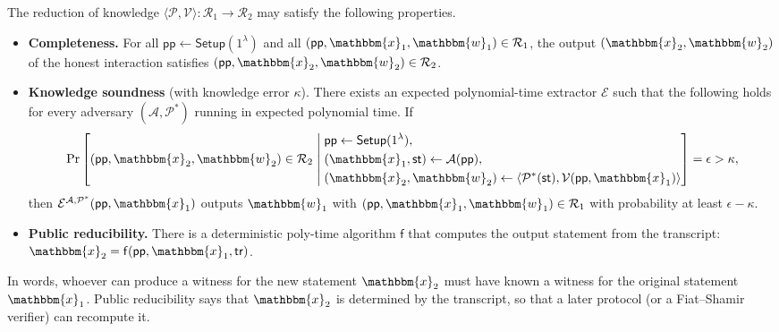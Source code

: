 \documentclass[../../book.tex]{subfiles}
\begin{document}
\begin{definition}
    The reduction of knowledge $\langle \mathcal{P}, \mathcal{V} \rangle: \mathcal{R}_1 \to \mathcal{R}_2$ may satisfy the following properties.
    \begin{itemize}
        \item \textbf{Completeness.} For all $\mathsf{pp} \gets \mathsf{Setup}(1^{\lambda})$ and all $(\mathsf{pp}, \mathbbm{x}_1, \mathbbm{w}_1) \in \mathcal{R}_1$, the output $(\mathbbm{x}_2, \mathbbm{w}_2)$ of the honest interaction satisfies $(\mathsf{pp}, \mathbbm{x}_2, \mathbbm{w}_2) \in \mathcal{R}_2$.
        \item \textbf{Knowledge soundness} (with knowledge error $\kappa$). There exists an expected polynomial-time extractor $\mathcal{E}$ such that the following holds for every adversary $(\mathcal{A}, \mathcal{P}^{\ast})$ running in expected polynomial time. If
        \begin{equation*}
            \Pr\left[(\mathsf{pp}, \mathbbm{x}_2, \mathbbm{w}_2) \in \mathcal{R}_2 \;\middle|\;
            \begin{aligned}
                & \mathsf{pp} \gets \mathsf{Setup}(1^{\lambda}), \\
                & (\mathbbm{x}_1, \mathsf{st}) \gets \mathcal{A}(\mathsf{pp}), \\
                & (\mathbbm{x}_2, \mathbbm{w}_2) \gets \langle \mathcal{P}^{\ast}(\mathsf{st}), \mathcal{V}(\mathsf{pp}, \mathbbm{x}_1) \rangle
            \end{aligned}
            \right] = \epsilon > \kappa,
        \end{equation*}
        then $\mathcal{E}^{\mathcal{A}, \mathcal{P}^{\ast}}(\mathsf{pp}, \mathbbm{x}_1)$ outputs $\mathbbm{w}_1$ with $(\mathsf{pp}, \mathbbm{x}_1, \mathbbm{w}_1) \in \mathcal{R}_1$ with probability at least $\epsilon - \kappa$.
        \item \textbf{Public reducibility.} There is a deterministic poly-time algorithm $\mathsf{f}$ that computes the output statement from the transcript: $\mathbbm{x}_2 = \mathsf{f}(\mathsf{pp}, \mathbbm{x}_1, \mathsf{tr})$.
    \end{itemize}
\end{definition}

In words, whoever can produce a witness for the new statement $\mathbbm{x}_2$ must have known a witness for the original statement $\mathbbm{x}_1$.
Public reducibility says that $\mathbbm{x}_2$ is determined by the transcript, so that a later protocol (or a Fiat--Shamir verifier) can recompute it.
\end{document}
